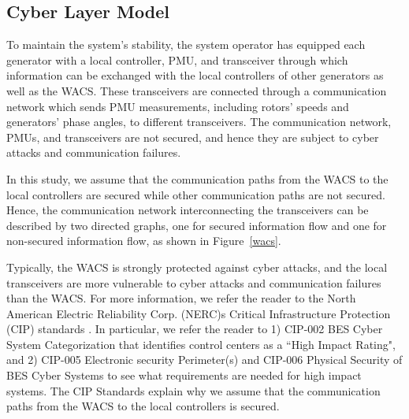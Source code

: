 \subsection{Cyber Layer Model}
To maintain the system's stability, the system operator has equipped each generator with a local controller, PMU, and transceiver through which information can be exchanged with the local controllers of other generators as well as the WACS. These transceivers are connected through a communication network which sends PMU measurements, including rotors' speeds and generators' phase angles, to different transceivers. The communication network, PMUs, and transceivers are not secured, and hence they are subject to cyber attacks and communication failures.

In this study, we assume that the communication paths from the WACS to the local controllers are secured while other communication paths are not secured. Hence, the communication network interconnecting the transceivers can be described by two directed graphs, one for secured information flow and one for non-secured information flow, as shown in Figure~\ref{wacs}.


Typically, the WACS is strongly protected against cyber attacks, and the local transceivers are more vulnerable to cyber attacks and communication failures than the WACS. For more information, we refer the reader to the North American Electric Reliability Corp. (NERC)s Critical Infrastructure Protection (CIP) standards \cite{nerc}. In particular, we refer the reader to 1) CIP-002 BES Cyber System Categorization that identifies control centers as a ``High Impact Rating", and 2) CIP-005 Electronic security Perimeter(s) and CIP-006 Physical Security of BES Cyber Systems to see what requirements are needed for high impact systems. The CIP Standards explain why we assume that the communication paths from the WACS to the local controllers is secured.

